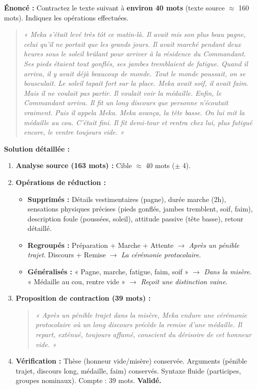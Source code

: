 \documentclass[11pt]{article}
\begin{document}
\begin{exoresolu}
    \textbf{Énoncé :} Contractez le texte suivant à \textbf{environ 40 mots} (texte source $\approx$ 160 mots). Indiquez les opérations effectuées.
    \begin{quote}
        \textit{« Meka s'était levé très tôt ce matin-là. Il avait mis son plus beau pagne, celui qu'il ne portait que les grands jours. Il avait marché pendant deux heures sous le soleil brûlant pour arriver à la résidence du Commandant. Ses pieds étaient tout gonflés, ses jambes tremblaient de fatigue. Quand il arriva, il y avait déjà beaucoup de monde. Tout le monde poussait, on se bousculait. Le soleil tapait fort sur la place. Meka avait soif, il avait faim. Mais il ne voulait pas partir. Il voulait voir la médaille. Enfin, le Commandant arriva. Il fit un long discours que personne n'écoutait vraiment. Puis il appela Meka. Meka avança, la tête basse. On lui mit la médaille au cou. C'était fini. Il fit demi-tour et rentra chez lui, plus fatigué encore, le ventre toujours vide. »}
    \end{quote}
    \tcblower
    \textbf{Solution détaillée :}
    \begin{enumerate}
        \item \textbf{Analyse source (163 mots) :} Cible $\approx$ 40 mots ($\pm$ 4).
        \item \textbf{Opérations de réduction :}
            \begin{itemize}
                \item \textbf{Supprimés :} Détails vestimentaires (pagne), durée marche (2h), sensations physiques précises (pieds gonflés, jambes tremblent, soif, faim), description foule (poussées, soleil), attitude passive (tête basse), retour détaillé.
                \item \textbf{Regroupés :} Préparation + Marche + Attente $\rightarrow$ \textit{Après un pénible trajet}. Discours + Remise $\rightarrow$ \textit{La cérémonie protocolaire}.
                \item \textbf{Généralisés :} « Pagne, marche, fatigue, faim, soif » $\rightarrow$ \textit{Dans la misère}. « Médaille au cou, rentre vide » $\rightarrow$ \textit{Reçoit une distinction vaine}.
            \end{itemize}
        \item \textbf{Proposition de contraction (39 mots) :}
            \begin{quote}
                \textit{« Après un pénible trajet dans la misère, Meka endure une cérémonie protocolaire où un long discours précède la remise d'une médaille. Il repart, exténué, toujours affamé, conscient du dérisoire de cet honneur vide. »}
            \end{quote}
        \item \textbf{Vérification :} Thèse (honneur vide/misère) conservée. Arguments (pénible trajet, discours long, médaille, faim) conservés. Syntaxe fluide (participes, groupes nominaux). Compte : 39 mots. \textbf{Validé.}
    \end{enumerate}
\end{exoresolu}
\end{document}
